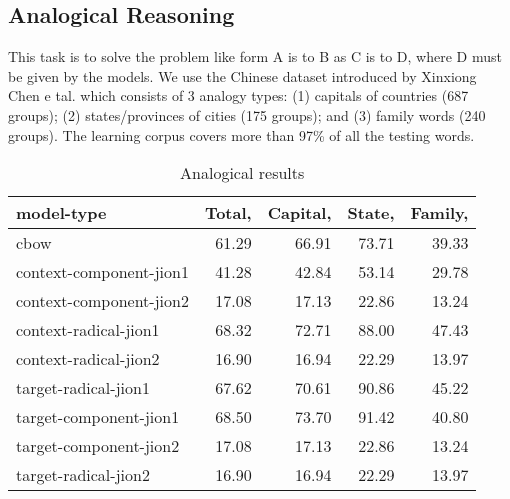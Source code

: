 \subsection{Analogical Reasoning}
This task is to solve the problem like form A is to B as C is to D, where D must be given by the models. We use the Chinese dataset introduced by Xinxiong Chen e tal. which consists of 3 analogy types: (1) capitals of countries (687 groups); (2) states/provinces of cities (175 groups); and (3) family words (240 groups). The learning corpus covers more than 97\% of all the testing words. 
\begin{table}[h]
\begin{center}
\begin{tabular}{lrrrr}
\hline \bf model-type & \bf Total, & \bf Capital, & \bf State, & \bf Family,\\ \hline
cbow & 61.29 & 66.91 & 73.71 & 39.33 \\
context-component-jion1 & 41.28 & 42.84 & 53.14 & 29.78 \\   
context-component-jion2 & 17.08 & 17.13 & 22.86 & 13.24 \\
context-radical-jion1 & 68.32 & 72.71 & 88.00 & 47.43 \\
context-radical-jion2 & 16.90 & 16.94 & 22.29 & 13.97 \\
target-radical-jion1  & 67.62 & 70.61 & 90.86 & 45.22 \\
target-component-jion1  & 68.50 & 73.70 & 91.42 & 40.80 \\
target-component-jion2 & 17.08 & 17.13 & 22.86 & 13.24 \\
target-radical-jion2 & 16.90 & 16.94 & 22.29 & 13.97 \\
\hline
\end{tabular}
\end{center}
\caption{\label{font-table} Analogical results }
\end{table}
